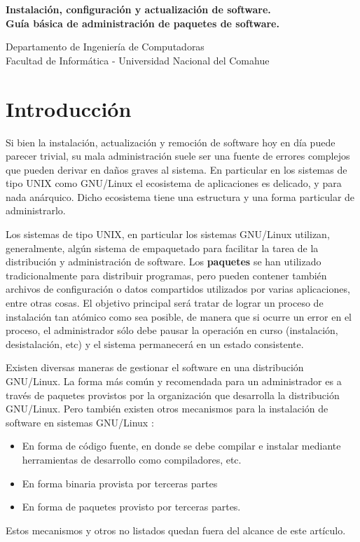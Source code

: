 \documentclass[12pt]{article}
\def\maketitle{

 \makeatletter
 {\color{bl} \centering \huge \sc \textbf{
  Instalación, configuración y actualización de software.\\ 
\large \vspace*{-8pt} \color{black} Guía básica de administración de paquetes de software. 
 \vspace*{8pt} }\par}
 \makeatother

\makeatletter
 {\centering \small 
 	Departamento de Ingeniería de Computadoras \\
 	Facultad de Informática - Universidad Nacional del Comahue \\
 	\vspace{20pt} }
 \makeatother

}
\begin{document}
\thispagestyle{empty}
\maketitle
\setlength{\parindent}{0pt}

\section*{Introducción}

Si bien la instalación, actualización y remoción de software hoy en día
puede parecer trivial, su mala administración suele ser una fuente de 
errores complejos que pueden derivar en daños graves al sistema. 
En particular en los sistemas de tipo UNIX como GNU/Linux el ecosistema
de aplicaciones es delicado, y para nada anárquico. Dicho ecosistema tiene 
una estructura y una forma particular de administrarlo. 

Los sistemas de tipo UNIX, en particular los sistemas GNU/Linux utilizan,
generalmente, algún sistema de empaquetado para facilitar la tarea de la 
distribución y administración de software.
Los {\bf paquetes} se han utilizado tradicionalmente para distribuir 
programas, pero pueden contener también archivos de configuración
o datos compartidos utilizados por varias aplicaciones, entre otras cosas. 
El objetivo principal
será tratar de lograr un proceso de instalación tan atómico como sea 
posible, de manera que si ocurre un error en el proceso, el administrador
sólo debe pausar la operación en curso (instalación, desistalación, etc)
y el sistema permanecerá en un estado consistente.

Existen diversas maneras de gestionar el software en una distribución 
GNU/Linux. La forma más común y recomendada para un administrador es a 
través de paquetes provistos por la organización que desarrolla la 
distribución GNU/Linux.  Pero también existen otros mecanismos para la 
instalación de software en sistemas GNU/Linux :

\begin{itemize}
\item En forma de código fuente, en donde se debe compilar e instalar 
mediante herramientas de desarrollo como compiladores, etc. 
\item En forma binaria provista por terceras partes
\item En forma de paquetes provisto por terceras partes. 
\end{itemize}

Estos mecanismos y otros no listados quedan fuera del alcance de este 
artículo.
\end{document}
